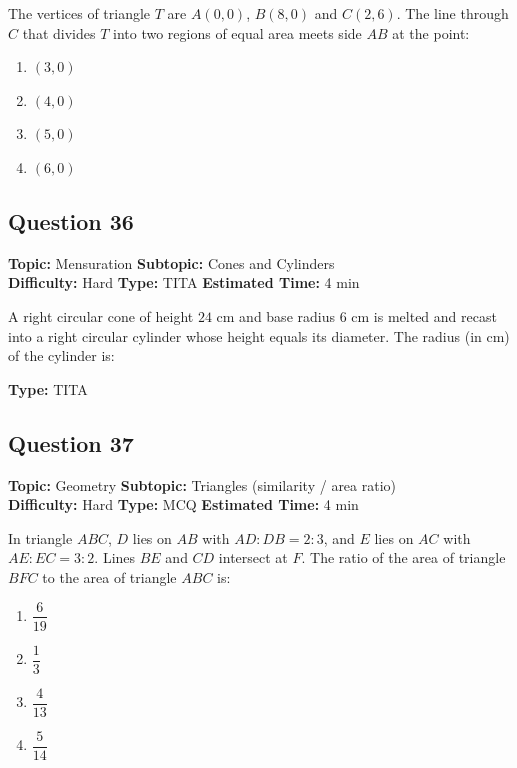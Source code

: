 \documentclass[11pt]{article}
\begin{document}
\begin{tcolorbox}
The vertices of triangle \(T\) are \(A(0,0)\), \(B(8,0)\) and \(C(2,6)\). The line through \(C\) that divides \(T\) into two regions of equal area meets side \(AB\) at the point:
\end{tcolorbox}

\begin{enumerate}[label=(\Alph*)]
    \item \((3, 0)\)
    \item \((4, 0)\)
    \item \((5, 0)\)
    \item \((6, 0)\)
\end{enumerate}

\subsection*{Question 36}
\textbf{Topic:} Mensuration \quad \textbf{Subtopic:} Cones and Cylinders \\
\textbf{Difficulty:} Hard \quad \textbf{Type:} TITA \quad \textbf{Estimated Time:} 4 min

\begin{tcolorbox}
A right circular cone of height \(24\) cm and base radius \(6\) cm is melted and recast into a right circular cylinder whose height equals its diameter. The radius (in cm) of the cylinder is:
\end{tcolorbox}

\textbf{Type:} TITA

\subsection*{Question 37}
\textbf{Topic:} Geometry \quad \textbf{Subtopic:} Triangles (similarity / area ratio) \\
\textbf{Difficulty:} Hard \quad \textbf{Type:} MCQ \quad \textbf{Estimated Time:} 4 min

\begin{tcolorbox}
In triangle \(ABC\), \(D\) lies on \(AB\) with \(AD : DB = 2 : 3\), and \(E\) lies on \(AC\) with \(AE : EC = 3 : 2\). Lines \(BE\) and \(CD\) intersect at \(F\). The ratio of the area of triangle \(BFC\) to the area of triangle \(ABC\) is:
\end{tcolorbox}

\begin{enumerate}[label=(\Alph*)]
    \item \(\dfrac{6}{19}\)
    \item \(\dfrac{1}{3}\)
    \item \(\dfrac{4}{13}\)
    \item \(\dfrac{5}{14}\)
\end{enumerate}
\end{document}
